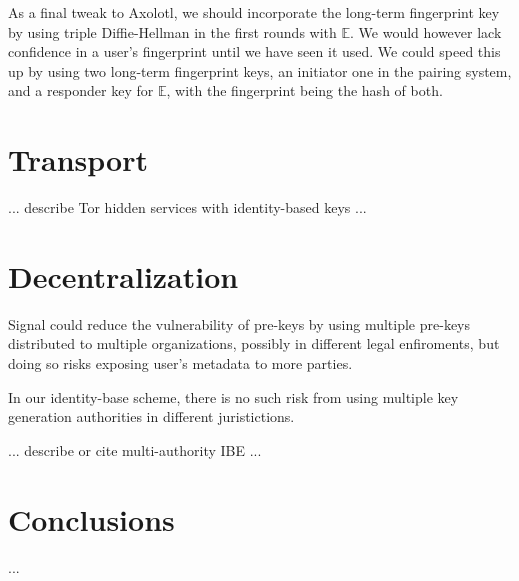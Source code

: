 \documentclass[twoside,letterpaper]{sig-alternate}
\begin{document}
As a final tweak to Axolotl, we should incorporate
the long-term fingerprint key by using triple Diffie-Hellman
in the first rounds with $\mathbb{E}$.  
We would however lack confidence in a user's fingerprint until
we have seen it used. 
We could speed this up by using two long-term fingerprint keys,
an initiator one in the pairing system, and
 a responder key for $\mathbb{E}$,
with the fingerprint being the hash of both.

\section{Transport}

... describe Tor hidden services with identity-based keys ...

\section{Decentralization}

Signal could reduce the vulnerability of pre-keys by using
multiple pre-keys distributed to multiple organizations,
 possibly in different legal enfiroments, but
doing so risks exposing user's metadata to more parties.

In our identity-base scheme, there is no such risk from using
multiple key generation authorities in different juristictions.

... describe or cite multi-authority IBE ...

\section{Conclusions} 

...







\end{document}
